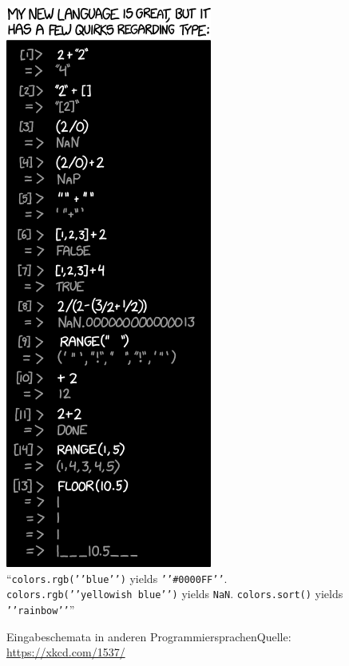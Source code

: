 \begin{figure}
	\centering
	\includegraphics[width=.4\linewidth]{./gfx/xkcd-types} \\
	\enquote{\texttt{colors.rgb('{}'blue'{}')} yields \texttt{'{}'\#0000FF'{}'}.
	 \texttt{colors.rgb('{}'yellowish blue'{}')} yields \texttt{NaN}. 
	 \texttt{colors.sort()} yields \texttt{'{}'rainbow'{}'}}
	\caption[Eingabeschemata in anderen Programmiersprachen]{Eingabeschemata in anderen Programmiersprachen\newline Quelle: \url{https://xkcd.com/1537/}}
\end{figure}